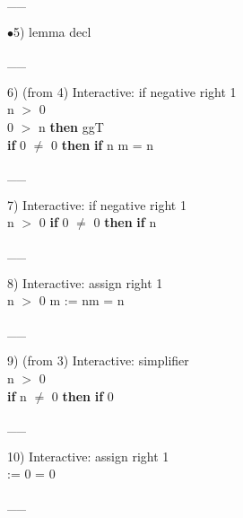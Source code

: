 \documentclass[a4paper]{article}
\begin{document}
\vspace{-1.5ex}\_\hrulefill \_

$\bullet$5) lemma decl \\
 \Fol 

\vspace{-1.5ex}\_\hrulefill \_

6)  (from 4) Interactive: if negative right  1\\
\tabf n $>$ 0 \\
\Fol {} 0 $>$ n {\bf then} ggT \\
 \tabf {} {\bf if} 0 $\neq$ 0 {\bf then} {\bf if} n %
m = n

\vspace{-1.5ex}\_\hrulefill \_

7) Interactive: if negative right  1\\
n $>$ 0 \Fol \Do 
{\bf if} 0 $\neq$ 0 {\bf then} 
{\bf if} n %

\vspace{-1.5ex}\_\hrulefill \_

8) Interactive: assign right  1\\
n $>$ 0 \Fol \Do m := n\Dc m = n

\vspace{-1.5ex}\_\hrulefill \_

9)  (from 3) Interactive: simplifier \\
\tabf \Not n $>$ 0 \\
\Fol \Do 
{\bf if} n $\neq$ 0 {\bf then} 
{\bf if} 0 %

\vspace{-1.5ex}\_\hrulefill \_

10) Interactive: assign right  1\\
 \Fol \Do {} := 0\Dc {} = 0

\vspace{-1.5ex}\_\hrulefill \_
\end{document}
